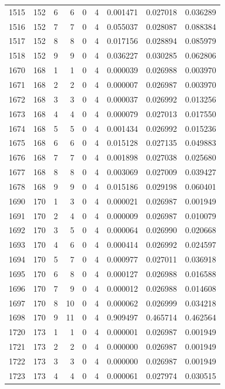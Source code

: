 \begin{longtable}{rrrrrrrrr}
1515 & 152 & 6 & 6 & 0 & 4 & 0.001471 & 0.027018 & 0.036289 \\
1516 & 152 & 7 & 7 & 0 & 4 & 0.055037 & 0.028087 & 0.088384 \\
1517 & 152 & 8 & 8 & 0 & 4 & 0.017156 & 0.028894 & 0.085979 \\
1518 & 152 & 9 & 9 & 0 & 4 & 0.036227 & 0.030285 & 0.062806 \\
1670 & 168 & 1 & 1 & 0 & 4 & 0.000039 & 0.026988 & 0.003970 \\
1671 & 168 & 2 & 2 & 0 & 4 & 0.000007 & 0.026987 & 0.003970 \\
1672 & 168 & 3 & 3 & 0 & 4 & 0.000037 & 0.026992 & 0.013256 \\
1673 & 168 & 4 & 4 & 0 & 4 & 0.000079 & 0.027013 & 0.017550 \\
1674 & 168 & 5 & 5 & 0 & 4 & 0.001434 & 0.026992 & 0.015236 \\
1675 & 168 & 6 & 6 & 0 & 4 & 0.015128 & 0.027135 & 0.049883 \\
1676 & 168 & 7 & 7 & 0 & 4 & 0.001898 & 0.027038 & 0.025680 \\
1677 & 168 & 8 & 8 & 0 & 4 & 0.003069 & 0.027009 & 0.039427 \\
1678 & 168 & 9 & 9 & 0 & 4 & 0.015186 & 0.029198 & 0.060401 \\
1690 & 170 & 1 & 3 & 0 & 4 & 0.000021 & 0.026987 & 0.001949 \\
1691 & 170 & 2 & 4 & 0 & 4 & 0.000009 & 0.026987 & 0.010079 \\
1692 & 170 & 3 & 5 & 0 & 4 & 0.000064 & 0.026990 & 0.020668 \\
1693 & 170 & 4 & 6 & 0 & 4 & 0.000414 & 0.026992 & 0.024597 \\
1694 & 170 & 5 & 7 & 0 & 4 & 0.000977 & 0.027011 & 0.036918 \\
1695 & 170 & 6 & 8 & 0 & 4 & 0.000127 & 0.026988 & 0.016588 \\
1696 & 170 & 7 & 9 & 0 & 4 & 0.000012 & 0.026988 & 0.014608 \\
1697 & 170 & 8 & 10 & 0 & 4 & 0.000062 & 0.026999 & 0.034218 \\
1698 & 170 & 9 & 11 & 0 & 4 & 0.909497 & 0.465714 & 0.462564 \\
1720 & 173 & 1 & 1 & 0 & 4 & 0.000001 & 0.026987 & 0.001949 \\
1721 & 173 & 2 & 2 & 0 & 4 & 0.000000 & 0.026987 & 0.001949 \\
1722 & 173 & 3 & 3 & 0 & 4 & 0.000000 & 0.026987 & 0.001949 \\
1723 & 173 & 4 & 4 & 0 & 4 & 0.000061 & 0.027974 & 0.030515 \\

\end{longtable}
